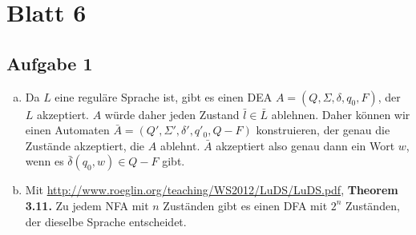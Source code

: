 \section*{Blatt 6}
%

\subsection*{Aufgabe 1}

\begin{enumerate}[a)]
  \item Da $L$ eine reguläre Sprache ist, gibt es einen DEA $A = (Q, \Sigma, \delta, q_0, F)$, der $L$ akzeptiert. $A$ würde daher jeden Zustand $\bar{l} \in \bar{L}$ ablehnen. Daher können wir einen Automaten $\bar{A} = (Q', \Sigma', \delta', q'_0, Q-F)$ konstruieren, der genau die Zustände akzeptiert, die $A$ ablehnt. $\bar{A}$ akzeptiert also genau dann ein Wort $w$, wenn es $\bar{\delta}(q_0, w) \in Q-F$ gibt.

  \item Mit \url{http://www.roeglin.org/teaching/WS2012/LuDS/LuDS.pdf}, \textbf{Theorem 3.11.} Zu jedem NFA mit $n$ Zuständen gibt es einen DFA mit $2^n$ Zuständen, der dieselbe Sprache entscheidet.
\end{enumerate}




